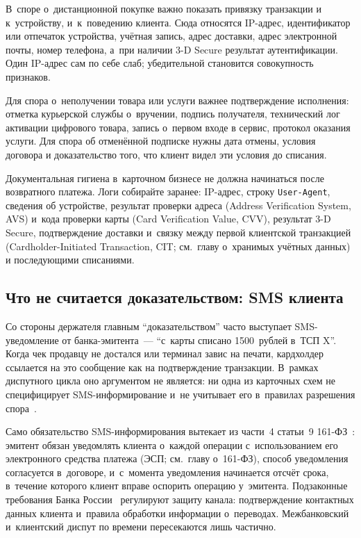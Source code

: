 В~споре о~дистанционной покупке важно показать привязку транзакции
и к~устройству, и~к~поведению клиента. Сюда относятся IP-адрес,
идентификатор или отпечаток устройства,
учётная запись, адрес доставки, адрес электронной почты, номер телефона,
а~при наличии 3-D Secure результат аутентификации. Один IP-адрес
сам по себе слаб; убедительной становится совокупность признаков.

Для спора о~неполучении товара или услуги важнее подтверждение
исполнения: отметка курьерской службы о~вручении, подпись получателя,
технический лог активации цифрового товара, запись о~первом входе в
сервис, протокол оказания услуги. Для спора об отменённой подписке
нужны дата отмены, условия договора и доказательство того, что клиент
видел эти условия до списания.

Документальная гигиена в~карточном бизнесе не должна начинаться
после возвратного платежа. Логи собирайте заранее: IP-адрес, строку
\texttt{User-Agent}, сведения об устройстве, результат проверки
адреса (Address Verification System, AVS) и~кода проверки карты
(Card Verification Value, CVV), результат 3-D Secure, подтверждение
доставки и~связку между первой клиентской транзакцией (Cardholder-Initiated
Transaction, CIT; см.~главу о~хранимых учётных данных) и последующими списаниями.

\subsection*{Что не считается доказательством: SMS клиента}\label{sec:disputes-sms-not-evidence}

Со стороны держателя главным \enquote{доказательством} часто
выступает SMS-уведомление от банка-эмитента~--- \enquote{с~карты
списано 1500~рублей в~ТСП X}. Когда чек продавцу не достался или
терминал завис на печати, кардхолдер ссылается на это сообщение
как на подтверждение транзакции. В~рамках диспутного цикла оно
аргументом не является: ни одна из карточных схем не специфицирует
SMS-информирование и~не учитывает его в~правилах разрешения
спора~\cite{visa-core-rules,mc-tpr}.

Само обязательство SMS-информирования вытекает из части~4 статьи~9
161-ФЗ~\cite{fz-161}: эмитент обязан уведомлять клиента о~каждой
операции с~использованием его электронного средства платежа
(ЭСП; см.~главу о~161-ФЗ), способ уведомления согласуется
в~договоре, и~с~момента уведомления начинается отсчёт срока, в~течение
которого клиент вправе оспорить операцию у~эмитента. Подзаконные
требования Банка России~\cite{cbr-821p} регулируют защиту канала:
подтверждение контактных данных клиента и~правила обработки
информации о~переводах. Межбанковский
и~клиентский диспут по времени пересекаются лишь частично.

